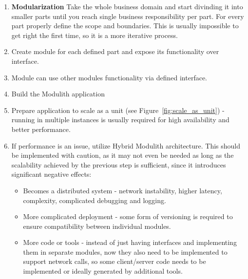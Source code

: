 
\begin{enumerate}
    \item \textbf{Modularization} Take the whole business domain and start divinding it into smaller parts until you reach single business responsibility per part. For every part properly define the scope and boundaries. This is usually impossible to get right the first time, so it is a more iterative process.
    \item Create module for each defined part and expose its functionality over interface.
    \item Module can use other modules functionality via defined interface.
    \item Build the Modulith application
    \item Prepare application to scale as a unit (see Figure~\ref{fig:scale_as_unit}) - running in multiple instances is usually required for high availability and better performance.
    \item If performance is an issue, utilize Hybrid Modulith architecture. This should be implemented with caution, as it may not even be needed as long as the scalability achieved by the previous step is sufficient, since it introduces significant negative effects:
          \begin{itemize}
              \item Becomes a distributed system - network instability, higher latency, complexity, complicated debugging and logging.
              \item More complicated deployment - some form of versioning is required to ensure compatibility between individual modules.
              \item More code or tools - instead of just having interfaces and implementing them in separate modules, now they also need to be implemented to support network calls, so some client/server code needs to be implemented or ideally generated by additional tools.
          \end{itemize}


\end{enumerate}
